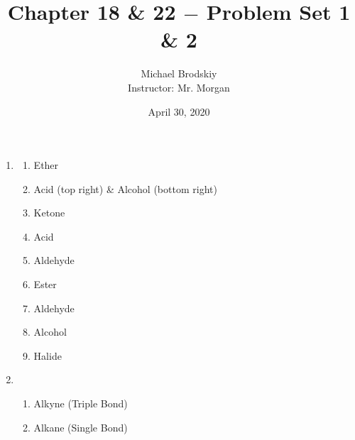 \documentclass[12pt]{article}
\title{Chapter 18 \& 22 $-$ Problem Set 1 \& 2}
\date{April 30, 2020}
\author{Michael Brodskiy\\ \small Instructor: Mr. Morgan}
\begin{document}
\maketitle

\begin{enumerate}

  \item 

    \begin{multicols}{3}

    \begin{enumerate}

      \item Ether

      \item Acid (top right) \& Alcohol (bottom right)

      \item Ketone

      \item Acid

      \item Aldehyde

      \item Ester

      \item Aldehyde

      \item Alcohol

      \item Halide

    \end{enumerate}

  \end{multicols}

  \item 

    \begin{enumerate}

      \item Alkyne (Triple Bond)
        
      \begin{center}
      \end{center}

      \item Alkane (Single Bond)

      \begin{center}
      \end{center}


\end{enumerate}
\end{enumerate}
\end{document}
